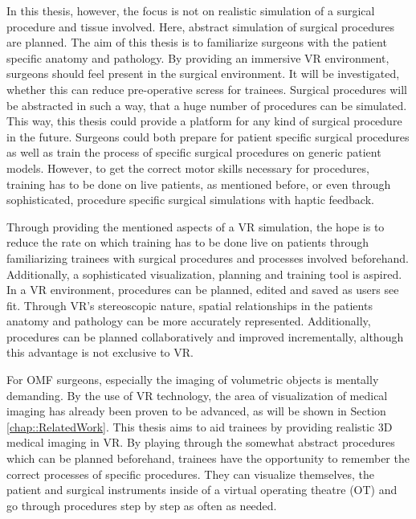 In this thesis, however, the focus is not on realistic simulation of a surgical procedure and tissue involved.
Here, abstract simulation of surgical procedures are planned.
The aim of this thesis is to familiarize surgeons with the patient specific anatomy and pathology.
By providing an immersive VR environment, surgeons should feel present in the surgical environment.
It will be investigated, whether this can reduce pre-operative scress for trainees.
Surgical procedures will be abstracted in such a way, that a huge number of procedures can be simulated.
This way, this thesis could provide a platform for any kind of surgical procedure in the future. 
Surgeons could both prepare for patient specific surgical procedures as well as train the process of specific surgical procedures on generic patient models.  
However, to get the correct motor skills necessary for procedures, training has to be done on live patients, as mentioned before, or even through sophisticated, procedure specific surgical 
simulations with haptic feedback.

Through providing the mentioned aspects of a VR simulation, the hope is to reduce the rate on which training has to be done live on patients through familiarizing trainees with 
surgical procedures and processes involved beforehand.
Additionally, a sophisticated visualization, planning and training tool is aspired.
\\ In a VR environment, procedures can be planned, edited and saved as users see fit.
Through VR's stereoscopic nature, spatial relationships in the patients anatomy and pathology can be more accurately represented.
Additionally, procedures can be planned collaboratively and improved incrementally, although this advantage is not exclusive to VR.

For OMF surgeons, especially the imaging of volumetric objects is mentally demanding. 
By the use of VR technology, the area of visualization of medical imaging has already been proven to be advanced, as will be shown in Section \ref{chap::RelatedWork}.
This thesis aims to aid trainees by providing realistic 3D medical imaging in VR.
By playing through the somewhat abstract procedures which can be planned beforehand, trainees have the opportunity to remember the correct processes of specific procedures.
They can visualize themselves, the patient and surgical instruments inside of a virtual operating theatre (OT) and go through procedures step by step as often as needed.